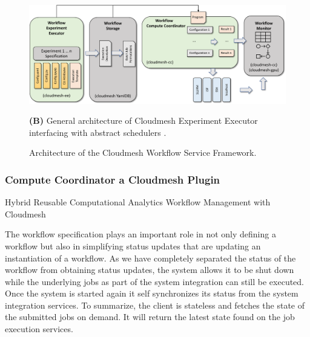 \documentclass[utf8]{FrontiersinVancouver} %
\begin{document}
\begin{figure}[htb]
{    \centering\includegraphics[width=1.0\columnwidth]{images/cloudmesh-ee-new}
    
    
    {\bf (B)} General architecture of Cloudmesh Experiment Executor interfacing with abstract schedulers \citep{las-frontiers-edu}.
  }

  
  
    \caption{Architecture of the Cloudmesh Workflow Service Framework.}
    \label{fig:cc-2}

\end{figure}
 


\subsubsection{Compute Coordinator a Cloudmesh Plugin}

\citep{las-2022-hybrid}
\citep{las-2022-templated}

Hybrid Reusable Computational Analytics Workflow
Management with Cloudmesh

The workflow specification plays an important role in not
only defining a workflow but also in simplifying status updates
that are updating an instantiation of a workflow. As we have
completely separated the status of the workflow from obtaining
status updates, the system allows it to be shut down while the
underlying jobs as part of the system integration can still be
executed. Once the system is started again it self synchronizes
its status from the system integration services. To summarize,
the client is stateless and fetches the state of the submitted
jobs on demand. It will return the latest state found on the job
execution services.
\end{document}
